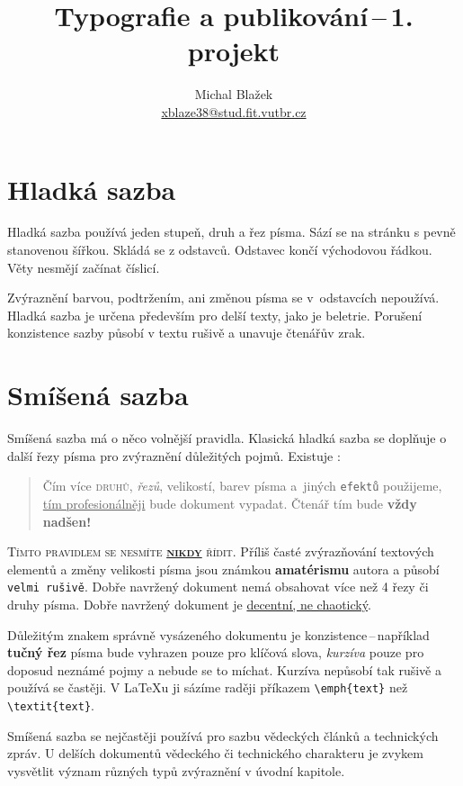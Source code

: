 \documentclass[a4paper, twocolumn, 10pt]{article}
\title{Typografie a publikování\,--\,1. projekt}
\author{Michal Blažek \\
\href{mailto:xblaze38@stud.fit.vutbr.cz}{xblaze38@stud.fit.vutbr.cz}}
\date{}
\begin{document}
\maketitle

\section{Hladká sazba}

Hladká sazba používá jeden stupeň, druh a řez písma.
Sází se na stránku s pevně stanovenou šířkou.
Skládá se z odstavců. Odstavec končí východovou řádkou.
Věty nesmějí začínat číslicí.

Zvýraznění barvou, podtržením, ani změnou písma se v~odstavcích nepoužívá.
Hladká sazba je určena především pro delší texty, jako je beletrie.
Porušení konzistence sazby působí v textu rušivě a unavuje čtenářův zrak.

\section{Smíšená sazba}


Smíšená sazba má o něco volnější pravidla.
Klasická hladká sazba se doplňuje o další řezy písma pro zvýraznění důležitých pojmů.
Existuje :

\begin{quotation}
Čím více \textsc{druhů}, \emph{řezů}, {\scriptsize velikostí}, {\color{red} barev} písma a~jiných \texttt{efektů} použijeme, \underline{tím profesionálněji} bude {\selectfont dokument} vypadat.
Čtenář tím bude {\LARGE \textbf{vždy nadšen!}}
\end{quotation}

\textsc{Tímto pravidlem se nesmíte \textbf{\underline{nikdy}} řídit.}
Příliš časté zvýrazňování textových elementů a změny {\tiny velikosti} písma jsou známkou \textbf{amatérismu} autora a působí \texttt{velmi rušivě}.
Dobře navržený dokument nemá obsahovat více než 4 řezy či druhy písma.
Dobře navržený dokument je \underline{decentní, ne chaotický}.

Důležitým znakem správně vysázeného dokumentu je konzistence\,--\,například \textbf{tučný řez} písma bude vyhrazen pouze pro klíčová slova, \emph{kurzíva} pouze pro doposud neznámé pojmy a nebude se to míchat.
Kurzíva nepůsobí tak rušivě a používá se častěji.
V \LaTeX u ji sázíme raději příkazem \verb|\emph{text}| než \verb|\textit{text}|.

Smíšená sazba se nejčastěji používá pro sazbu vědeckých článků a technických zpráv.
U delších dokumentů vědeckého či technického charakteru je zvykem vysvětlit význam různých typů zvýraznění v úvodní kapitole.
\end{document}
